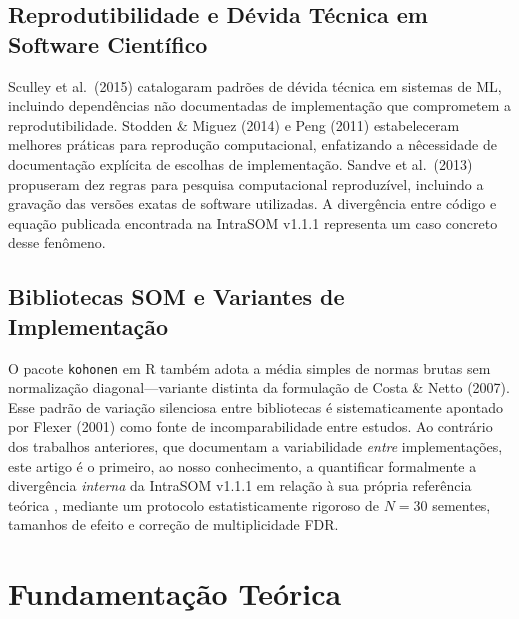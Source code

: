 \documentclass[10pt,journal,compsoc,twocolumn]{IEEEtran}
\begin{document}
\subsection{Reprodutibilidade e D\'evida T\'ecnica em Software Cient\'ifico}
Sculley et al.\ (2015) \cite{sculley2015hidden} catalogaram padr\~oes de d\'evida
t\'ecnica em sistemas de ML, incluindo depend\^encias n\~ao documentadas de
implementa\c{c}\~ao que comprometem a reprodutibilidade. Stodden \& Miguez
(2014) \cite{stodden2014implementing} e Peng (2011) \cite{peng2011reproducible}
estabeleceram melhores pr\'aticas para reprodu\c{c}\~ao computacional, enfatizando
a n\^ecessidade de documenta\c{c}\~ao expl\'icita de escolhas de implementa\c{c}\~ao.
Sandve et al.\ (2013) \cite{sandve2013ten} propuseram dez regras para pesquisa
computacional reproduz\'ivel, incluindo a grava\c{c}\~ao das vers\~oes exatas de
software utilizadas. A diverg\^encia entre c\'odigo e equa\c{c}\~ao publicada
encontrada na IntraSOM v1.1.1 representa um caso concreto desse fen\^omeno.

\subsection{Bibliotecas SOM e Variantes de Implementa\c{c}\~ao}
O pacote \texttt{kohonen} em R \cite{wehrens2007self} tamb\'em adota a m\'edia
simples de normas brutas sem normaliza\c{c}\~ao diagonal---variante distinta
da formula\c{c}\~ao de Costa \& Netto (2007). Esse padr\~ao de varia\c{c}\~ao
silenciosa entre bibliotecas \'e sistematicamente apontado por Flexer (2001)
\cite{flexer2001use} como fonte de incomparabilidade entre estudos.
Ao contr\'ario dos trabalhos anteriores, que documentam a variabilidade
\textit{entre} implementa\c{c}\~oes, este artigo \'e o primeiro, ao nosso
conhecimento, a quantificar formalmente a diverg\^encia \textit{interna}
da IntraSOM v1.1.1 em rela\c{c}\~ao \`a sua pr\'opria refer\^encia te\'orica
\cite{costa2007segmentacao}, mediante um protocolo estatisticamente rigoroso
de $N=30$ sementes, tamanhos de efeito e corre\c{c}\~ao de multiplicidade FDR.

\section{Fundamenta\c{c}\~ao Te\'orica}
\label{sec:fundamentacao}
\end{document}
